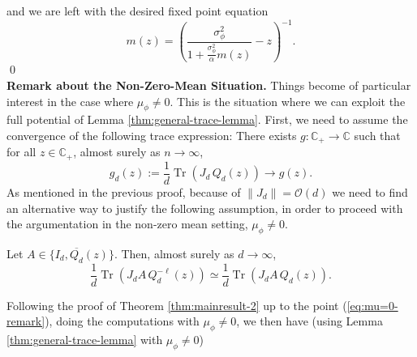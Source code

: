\documentclass{article}
\begin{document}
and we are left with the desired fixed point equation
\begin{equation}
m(z)=\left(\frac{\sigma_\phi^2}{1+\frac{\sigma_\phi^2}{\alpha}m(z)}-z\right)^{-1}.
\end{equation}
\qed
\bigskip
\bigskip
\\
\textbf{Remark about the Non-Zero-Mean Situation.} Things become of particular interest in the case where $\mu_\phi\neq0$. This is the situation where we can exploit the full potential of Lemma \ref{thm:general-trace-lemma}. First, we need to assume the convergence of the following trace expression: There exists $g:\mathbb{C}_+\to\mathbb{C}$ such that for all $z\in\mathbb{C}_+$, almost surely as $n\to\infty$,
\begin{equation}
g_d(z):=\frac{1}{d}\operatorname{Tr}(J_d\,Q_d(z))\to g(z).\label{eq:heavy-trace}
\end{equation}
As mentioned in the previous proof, because of $\left\|J_d\right\|=\mathcal{O}(d)$ we need to find an alternative way to justify the following assumption, in order to proceed with the argumentation in the non-zero mean setting, $\mu_\phi\neq0$.
\bigskip
\begin{assumption} Let $A\in\{I_d,\overline{Q_d}(z)\}$. Then, almost surely as $d\to\infty$,
$$\frac{1}{d}\operatorname{Tr}(J_dA\,Q_d^{-\ell}(z))\simeq\frac{1}{d}\operatorname{Tr}(J_dA\,Q_d(z)).$$\label{thm:m=0-assumption}
\end{assumption}
\bigskip
\par
Following the proof of Theorem \ref{thm:mainresult-2} up to the point (\ref{eq:mu=0-remark}), doing the computations with $\mu_\phi\neq0$, we then have (using Lemma \ref{thm:general-trace-lemma} with $\mu_\phi\neq0$)
\end{document}
